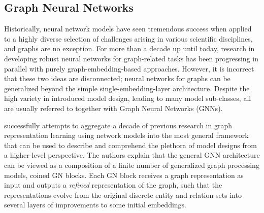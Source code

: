 \subsection{Graph Neural Networks}
Historically, neural network models have seen tremendous success when applied to a highly diverse selection of challenges arising in various scientific disciplines, and graphs are no exception. For more than a decade up until today, research in developing robust neural networks for graph-related tasks has been progressing in parallel with purely graph-embedding-based approaches. However, it is incorrect that these two ideas are disconnected; neural networks for graphs can be generalized beyond the simple single-embedding-layer architecture. Despite the high variety in introduced model design, leading to many model sub-classes, all are usually referred to together with Graph Neural Networks (GNNs).

\cite{battaglia_relational_2018} successfully attempts to aggregate a decade of previous research in graph representation learning using network models into the most general framework that can be used to describe and comprehend the plethora of model designs from a higher-level perspective. The authors explain that the general GNN architecture can be viewed as a composition of a finite number of generalized graph processing models, coined GN blocks. Each GN block receives a graph representation as input and outputs a \emph{refined} representation of the graph, such that the representations evolve from the original discrete entity and relation sets into several layers of improvements to some initial embeddings. 

